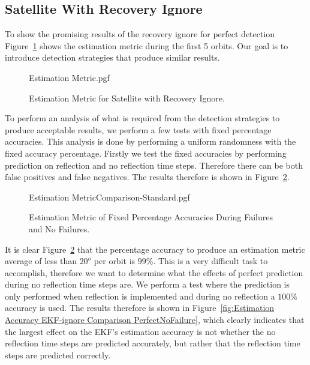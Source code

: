 \documentclass[letterpaper, 10 pt, conference]{ieeeconf}  %
\begin{document}
\subsection{Satellite With Recovery Ignore}
To show the promising results of the recovery ignore for perfect detection Figure~\ref{fig:Estimation Accuracy EKF-ignore} shows the estimation metric during the first 5 orbits. Our goal is to introduce detection strategies that produce similar results.

\begin{figure}[!htb]
	\begin{center}
		{Estimation Metric.pgf}
	\end{center}
	\caption[Estimation Metric for Satellite with Recovery Ignore]{Estimation Metric for Satellite with Recovery Ignore.}
	\label{fig:Estimation Accuracy EKF-ignore}
\end{figure}

To perform an analysis of what is required from the detection strategies to produce acceptable results, we perform a few tests with fixed percentage accuracies. This analysis is done by performing a uniform randomness with the fixed accuracy percentage. Firstly we test the fixed accuracies by performing prediction on reflection and no reflection time steps. Therefore there can be both false positives and false negatives. The results therefore is shown in Figure~\ref{fig:Estimation Accuracy EKF-ignore Comparison}.

\begin{figure}[!htb]
	\begin{center}
		{Estimation MetricComparison-Standard.pgf}
	\end{center}
	\caption[Estimation Metric of Fixed Percentage Accuracies During Failures and No Failures]{Estimation Metric of Fixed Percentage Accuracies During Failures and No Failures.}
	\label{fig:Estimation Accuracy EKF-ignore Comparison}
\end{figure}

It is clear Figure~\ref{fig:Estimation Accuracy EKF-ignore Comparison} that the percentage accuracy to produce an estimation metric average of less than $20^o$ per orbit is $99\%$. This is a very difficult task to accomplish, therefore we want to determine what the effects of perfect prediction during no reflection time steps are. We perform a test where the prediction is only performed when reflection is implemented and during no reflection a $100\%$ accuracy is used. The results therefore is shown in Figure~\ref{fig:Estimation Accuracy EKF-ignore Comparison PerfectNoFailure}, which clearly indicates that the largest effect on the EKF's estimation accuracy is not whether the no reflection time steps are predicted accurately, but rather that the reflection time steps are predicted correctly.
\end{document}
